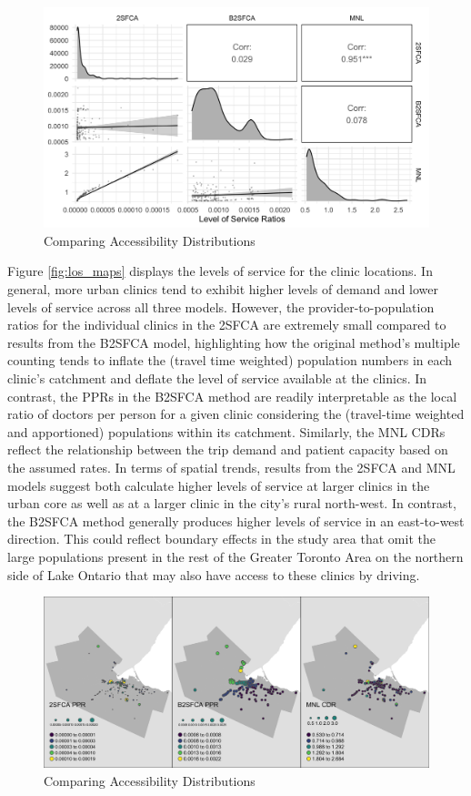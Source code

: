 \documentclass{article}
\begin{document}
\begin{figure}
\includegraphics[width=1\linewidth]{./img/pair_plot_ppr} \caption{\label{fig:ppr_dist}Comparing Accessibility Distributions}\label{fig:ppr_dist_fig}
\end{figure}

Figure \ref{fig:los_maps} displays the levels of service for the clinic
locations. In general, more urban clinics tend to exhibit higher levels
of demand and lower levels of service across all three models. However,
the provider-to-population ratios for the individual clinics in the
2SFCA are extremely small compared to results from the B2SFCA model,
highlighting how the original method's multiple counting tends to
inflate the (travel time weighted) population numbers in each clinic's
catchment and deflate the level of service available at the clinics. In
contrast, the PPRs in the B2SFCA method are readily interpretable as the
local ratio of doctors per person for a given clinic considering the
(travel-time weighted and apportioned) populations within its catchment.
Similarly, the MNL CDRs reflect the relationship between the trip demand
and patient capacity based on the assumed rates. In terms of spatial
trends, results from the 2SFCA and MNL models suggest both calculate
higher levels of service at larger clinics in the urban core as well as
at a larger clinic in the city's rural north-west. In contrast, the
B2SFCA method generally produces higher levels of service in an
east-to-west direction. This could reflect boundary effects in the study
area that omit the large populations present in the rest of the Greater
Toronto Area on the northern side of Lake Ontario that may also have
access to these clinics by driving.

\begin{figure}
\includegraphics[width=1\linewidth]{./img/los_maps} \caption{\label{fig:los_maps}Comparing Accessibility Distributions}\label{fig:los_maps_fig}
\end{figure}
\end{document}
